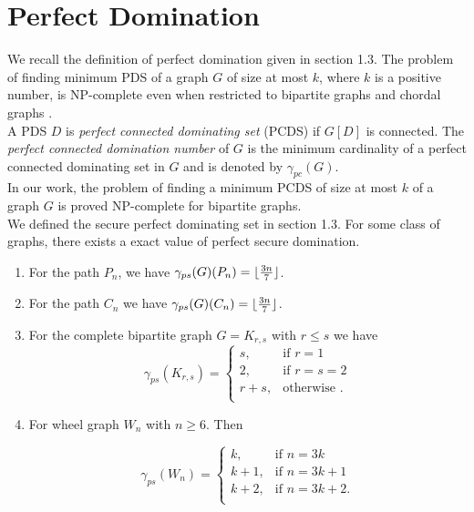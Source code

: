 \section{Perfect Domination}
\noindent
We recall the definition of perfect domination given in section 1.3. The problem of finding minimum PDS of a graph $G$ of size at most $k$, where $k$ is a positive number, is NP-complete even when restricted to bipartite graphs and chordal graphs \cite{Yen}.\\
A PDS $D$ is \textit{perfect connected dominating set} (PCDS) if $G[D]$ is connected. The \textit{perfect connected domination number} of $G$ is the minimum cardinality of a perfect connected dominating set in $G$ and is denoted by $\gamma_{pc}(G)$.\\
In our work, the problem of finding a minimum PCDS of size at most $k$ of a graph $G$ is proved NP-complete for bipartite graphs.\\   
We defined the secure perfect dominating set in section 1.3. For some class of graphs, there exists a exact value of perfect secure domination. 
\begin{enumerate}
\item For the path $P_n$, we have $\gamma_{ps}(G)(P_n)= \lfloor\frac{3n}{7}\rfloor$.
\item For the path $C_n$ we have $\gamma_{ps}(G)(C_n)  = \lfloor\frac{3n}{7}\rfloor$.
\item For the complete bipartite graph $G = K_{r,s}$ with $r\leq s$ we have
\[
\gamma_{ps}(K_{r,s}) = \begin{cases}
s, & \text{if }r=1 \\
2, & \text{if }r=s=2 \\
r+s, & \text{otherwise }. \\
\end{cases} 
\]
\item For wheel graph $W_n$ with $n \geq 6$. Then

\[
\gamma_{ps}(W_n) = \begin{cases}
k, & \text{if }n=3k \\
k+1, & \text{if }n=3k+1 \\
k+2, & \text{if }n=3k+2. \\
\end{cases} 
\]
\end{enumerate}

